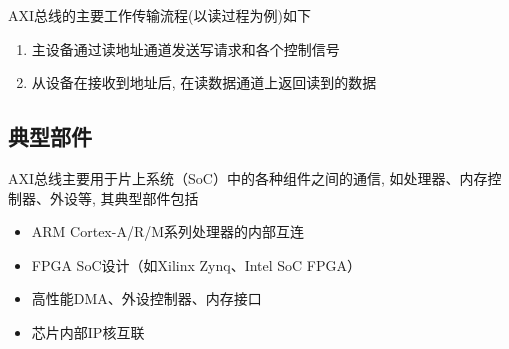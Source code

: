 \documentclass[14pt]{article}
\begin{document}
AXI总线的主要工作传输流程(以读过程为例)如下
\begin{enumerate}
    \item 主设备通过读地址通道发送写请求和各个控制信号
    \item 从设备在接收到地址后, 在读数据通道上返回读到的数据
\end{enumerate}

\subsection{典型部件}
AXI总线主要用于片上系统（SoC）中的各种组件之间的通信, 如处理器、内存控制器、外设等, 其典型部件包括
\begin{itemize}
    \item ARM Cortex-A/R/M系列处理器的内部互连
    \item FPGA SoC设计（如Xilinx Zynq、Intel SoC FPGA）
    \item 高性能DMA、外设控制器、内存接口
    \item 芯片内部IP核互联
\end{itemize}
\end{document}
